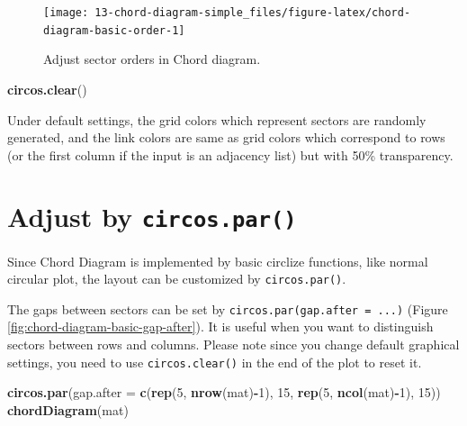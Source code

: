 \documentclass[]{book}
\newenvironment{Shaded}{\begin{snugshade}}{\end{snugshade}}
\newcommand{\KeywordTok}[1]{\textcolor[rgb]{0.13,0.29,0.53}{\textbf{#1}}}
\newcommand{\DataTypeTok}[1]{\textcolor[rgb]{0.13,0.29,0.53}{#1}}
\newcommand{\DecValTok}[1]{\textcolor[rgb]{0.00,0.00,0.81}{#1}}
\newcommand{\OperatorTok}[1]{\textcolor[rgb]{0.81,0.36,0.00}{\textbf{#1}}}
\newcommand{\NormalTok}[1]{#1}
\begin{document}
\begin{figure}

{\centering \texttt{[image: 13-chord-diagram-simple\_files/figure-latex/chord-diagram-basic-order-1]} 

}

\caption{Adjust sector orders in Chord diagram.}\label{fig:chord-diagram-basic-order}
\end{figure}

\begin{Shaded}
\begin{Highlighting}[]
\KeywordTok{circos.clear}\NormalTok{()}
\end{Highlighting}
\end{Shaded}

Under default settings, the grid colors which represent sectors are
randomly generated, and the link colors are same as grid colors which
correspond to rows (or the first column if the input is an adjacency
list) but with 50\% transparency.

\section{\texorpdfstring{Adjust by
\texttt{circos.par()}}{Adjust by circos.par()}}\label{adjust-by-circos.par}

Since Chord Diagram is implemented by basic circlize functions, like
normal circular plot, the layout can be customized by
\texttt{circos.par()}.

The gaps between sectors can be set by
\texttt{circos.par(gap.after\ =\ ...)} (Figure
\ref{fig:chord-diagram-basic-gap-after}). It is useful when you want to
distinguish sectors between rows and columns. Please note since you
change default graphical settings, you need to use
\texttt{circos.clear()} in the end of the plot to reset it.

\begin{Shaded}
\begin{Highlighting}[]
\KeywordTok{circos.par}\NormalTok{(}\DataTypeTok{gap.after =} \KeywordTok{c}\NormalTok{(}\KeywordTok{rep}\NormalTok{(}\DecValTok{5}\NormalTok{, }\KeywordTok{nrow}\NormalTok{(mat)}\OperatorTok{-}\DecValTok{1}\NormalTok{), }\DecValTok{15}\NormalTok{, }\KeywordTok{rep}\NormalTok{(}\DecValTok{5}\NormalTok{, }\KeywordTok{ncol}\NormalTok{(mat)}\OperatorTok{-}\DecValTok{1}\NormalTok{), }\DecValTok{15}\NormalTok{))}
\KeywordTok{chordDiagram}\NormalTok{(mat)}
\end{Highlighting}
\end{Shaded}
\end{document}
